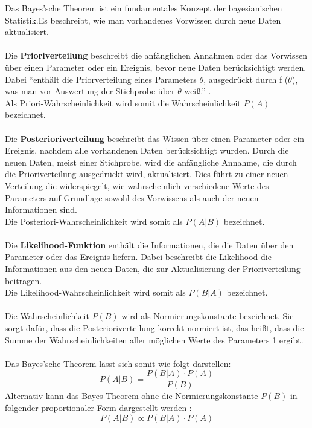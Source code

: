 \documentclass[a4paper,12pt]{article}
\begin{document}
Das Bayes'sche Theorem ist ein fundamentales Konzept der bayesianischen Statistik.Es beschreibt, wie man vorhandenes Vorwissen durch neue Daten aktualisiert. \\\\
Die \textbf{Prioriverteilung} beschreibt die anfänglichen Annahmen oder das Vorwissen über einen 
Parameter oder ein Ereignis, bevor neue Daten berücksichtigt werden.
Dabei ``enthält die Priorverteilung eines Parameters $\theta$, ausgedrückt durch f ($ \theta $), 
was man vor Auswertung der Stichprobe über $\theta$ weiß.'' \parencite[90]{StatistikKlassischOderBayes}. \\
Als Priori-Wahrscheinlichkeit wird somit die Wahrscheinlichkeit $ P(A) $ bezeichnet. \\\\
Die \textbf{Posterioriverteilung} beschreibt das Wissen über einen Parameter oder ein Ereignis, nachdem alle 
vorhandenen Daten berücksichtigt wurden. Durch die neuen Daten, meist einer Stichprobe, wird die 
anfängliche Annahme, die durch die Prioriverteilung ausgedrückt wird, aktualisiert. 
Dies führt zu einer neuen Verteilung die widerspiegelt, wie wahrscheinlich verschiedene Werte 
des Parameters auf Grundlage sowohl des Vorwissens als auch der neuen Informationen sind. \parencite[109]{StatistikKlassischOderBayes}\\
Die Posteriori-Wahrscheinlichkeit wird somit als $ P(A|B) $ bezeichnet. \\\\
Die \textbf{Likelihood-Funktion} enthält die Informationen, die die Daten über den Parameter oder das Ereignis liefern.
Dabei beschreibt die Likelihood die Informationen aus den neuen Daten, die zur Aktualisierung der Prioriverteilung beitragen. \parencite[88]{StatistikKlassischOderBayes}\\
Die Likelihood-Wahrscheinlichkeit wird somit als $ P(B|A) $ bezeichnet. \\\\
Die Wahrscheinlichkeit $ P(B) $ wird als Normierungskonstante bezeichnet. Sie sorgt dafür, 
dass die Posterioriverteilung korrekt normiert ist, das heißt, dass die Summe der 
Wahrscheinlichkeiten aller möglichen Werte des Parameters 1 ergibt. \parencite[109]{StatistikKlassischOderBayes} \\\\
Das Bayes'sche Theorem lässt sich somit wie folgt darstellen:
\begin{equation}
P(A|B) = \frac{P(B|A) \cdot P(A)}{P(B)}
\end{equation}
Alternativ kann das Bayes-Theorem ohne die Normierungskonstante $ P(B) $ in folgender proportionaler Form dargestellt werden \parencite[15]{BayesStatistik}:
\begin{equation}
P(A|B) \propto P(B|A) \cdot P(A)
\end{equation} 
\end{document}
